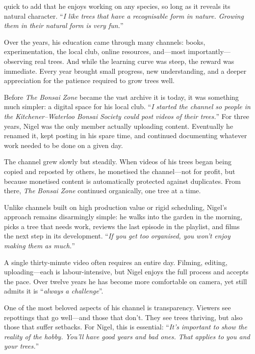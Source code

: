 \noindent 
quick to add that he enjoys working on any species, so long as it reveals its natural character.
``\textit{I like trees that have a recognisable form in nature. Growing them in their natural form is very fun.}''

Over the years, his education came through many channels: books, experimentation, the local club, online resources, and---most importantly---observing real trees.
And while the learning curve was steep, the reward was immediate.
Every year brought small progress, new understanding, and a deeper appreciation for the patience required to grow trees well.

\medskip
{}
\noindent
Before \textit{The Bonsai Zone} became the vast archive it is today, it was something much simpler: a digital space for his local club.
``\textit{I started the channel so people in the Kitchener–Waterloo Bonsai Society could post videos of their trees.}''
For three years, Nigel was the only member actually uploading content.
Eventually he renamed it, kept posting in his spare time, and continued documenting whatever work needed to be done on a given day.

The channel grew slowly but steadily.
When videos of his trees began being copied and reposted by others, he monetised the channel---not for profit, but because monetised content is automatically protected against duplicates.
From there, \textit{The Bonsai Zone} continued organically, one tree at a time.

Unlike channels built on high production value or rigid scheduling, Nigel's approach remains disarmingly simple: he walks into the garden in the morning, picks a tree that needs work, reviews the last episode in the playlist, and films the next step in its development.
``\textit{If you get too organised, you won't enjoy making them as much.}''

A single thirty\--minute video often requires an entire day.
Filming, editing, uploading---each is labour\--intensive, but Nigel enjoys the full process and accepts the pace.
Over twelve years he has become more comfortable on camera, yet still admits it is ``\textit{always a challenge}''.

One of the most beloved aspects of his channel is transparency.
Viewers see repottings that go well---and those that don't.
They see trees thriving, but also those that suffer setbacks.
For Nigel, this is essential: ``\textit{It's important to show the reality of the hobby. You'll have good years and bad ones. That applies to you and your trees.}''

